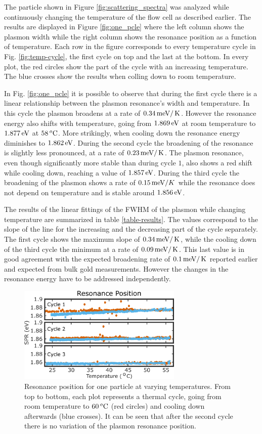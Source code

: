The particle shown in Figure \ref{fig:scattering_spectra} was analyzed while
continuously changing the temperature of the flow cell as described earlier. The
results are displayed in Figure \ref{fig:one_pcle} where the left column shows
the plasmon width while the right column shows the resonance position as a
function of temperature. Each row in the figure corresponds to every temperature
cycle in Fig. \ref{fig:temp-cycle}, the first cycle on top and the last at the
bottom. In every plot, the red circles show the part of the cycle with
an increasing temperature. The blue crosses show the results when
colling down to room temperature. 

In Fig. \ref{fig:one_pcle} it is possible to observe that during the first cycle
there is a linear relationship between the plasmon resonance's width and
temperature. In this cycle the plasmon broadens at a rate of $0.34\,\textrm{meV}/\,\textrm{K}$.
However the resonance energy also shifts with temperature, going from $1.869\,\textrm{eV}$
at room temperature to $1.877\,\textrm{eV}$ at $58\,^o\textrm{C}$. More strikingly, when cooling
down the resonance energy diminishes to $1.862\,\textrm{eV}$. During the second cycle the
broadening of the resonance is slightly less pronounced, at a rate of
$0.23\,\textrm{meV}/\,\textrm{K}$. The plasmon resonance, even though significantly more stable
than during cycle $1$, also shows a red shift while cooling down, reaching a value of
$1.857\,\textrm{eV}$. During the third cycle the broadening of the plasmon shows a rate of
$0.15\,\textrm{meV}/K$ while the resonance does not depend on temperature and is stable
around $1.856\,\textrm{eV}$.

The results of the linear fittings of the FWHM of the plasmon while changing
temperature are summarized in table \ref{table-results}. The values correspond
to the slope of the line for the increasing and the decreasing part of the cycle
separately. The first cycle shows the maximum slope of $0.34\,\textrm{meV}/\,\textrm{K}$, while the
cooling down of the third cycle the minimum at a rate of $0.09\,\textrm{meV}/\,\textrm{K}$. This
last value is in good agreement with the expected broadening rate of
$0.1\,\textrm{meV}/\,\textrm{K}$ reported earlier\cite{Liu2009b,Konrad2013} and expected from bulk gold
measurements. However the changes in the resonance energy have to be addressed
independently.

\begin{figure}[tp] \centering
\includegraphics[width=78.2mm]{Chapters/05_WhiteLight/Figures/02_One_Pcle/02_One_Pcle_02.png}
\caption{Resonance position for one particle at varying temperatures. From top
to bottom, each plot represents a thermal cycle, going from room temperature to
$60\,^o\textrm{C}$ (red circles) and cooling down afterwards (blue crosses). It can be
seen that after the second cycle there is no variation of the plasmon resonance
position.}
	\label{fig:one_pcle_spr}
\end{figure}

